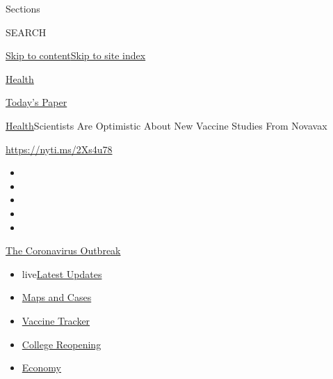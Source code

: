 Sections

SEARCH

\protect\hyperlink{site-content}{Skip to
content}\protect\hyperlink{site-index}{Skip to site index}

\href{https://www.nytimes.com/section/health}{Health}

\href{https://myaccount.nytimes.com/auth/login?response_type=cookie\&client_id=vi}{}

\href{https://www.nytimes.com/section/todayspaper}{Today's Paper}

\href{/section/health}{Health}\textbar{}Scientists Are Optimistic About
New Vaccine Studies From Novavax

\url{https://nyti.ms/2Xs4u78}

\begin{itemize}
\item
\item
\item
\item
\item
\end{itemize}

\href{https://www.nytimes.com/news-event/coronavirus?action=click\&pgtype=Article\&state=default\&region=TOP_BANNER\&context=storylines_menu}{The
Coronavirus Outbreak}

\begin{itemize}
\tightlist
\item
  live\href{https://www.nytimes.com/2020/08/04/world/coronavirus-cases.html?action=click\&pgtype=Article\&state=default\&region=TOP_BANNER\&context=storylines_menu}{Latest
  Updates}
\item
  \href{https://www.nytimes.com/interactive/2020/us/coronavirus-us-cases.html?action=click\&pgtype=Article\&state=default\&region=TOP_BANNER\&context=storylines_menu}{Maps
  and Cases}
\item
  \href{https://www.nytimes.com/interactive/2020/science/coronavirus-vaccine-tracker.html?action=click\&pgtype=Article\&state=default\&region=TOP_BANNER\&context=storylines_menu}{Vaccine
  Tracker}
\item
  \href{https://www.nytimes.com/2020/08/02/us/covid-college-reopening.html?action=click\&pgtype=Article\&state=default\&region=TOP_BANNER\&context=storylines_menu}{College
  Reopening}
\item
  \href{https://www.nytimes.com/live/2020/08/04/business/stock-market-today-coronavirus?action=click\&pgtype=Article\&state=default\&region=TOP_BANNER\&context=storylines_menu}{Economy}
\end{itemize}

